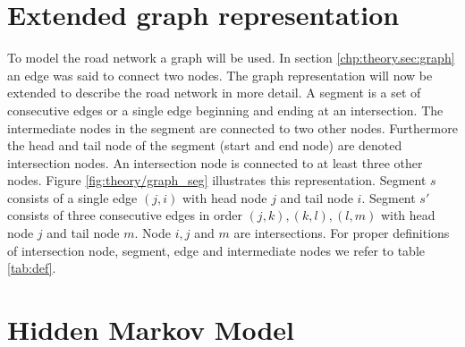 \section{Extended graph representation}
\label{chp:theory:sec:extgraph}

To model the road network a graph will be used. In section \ref{chp:theory.sec:graph} an edge was said to connect two nodes. The graph representation will now be extended to describe the road network in more detail. A segment is a set of consecutive edges or a single edge beginning and ending at an intersection. The intermediate nodes in the segment are connected to two other nodes. Furthermore the head and tail node of the segment (start and end node) are denoted intersection nodes. An intersection node is connected to at least three other nodes. Figure \ref{fig:theory/graph_seg} illustrates this representation. Segment $s$ consists of a single edge $(j,i)$ with head node $j$ and tail node $i$. Segment $s'$ consists of three consecutive edges in order $(j,k), (k,l), (l,m)$ with head node $j$ and tail node $m$. Node $i, j$ and $m$ are intersections. For proper definitions of intersection node, segment, edge and intermediate nodes we refer to table \ref{tab:def}.

\section{Hidden Markov Model}
\label{chp:theory:sec:HMM}


